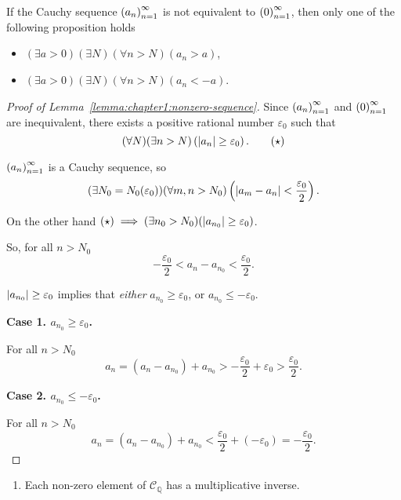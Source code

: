 \begin{lemma}\label{lemma:chapter1:nonzero-sequence}
    If the Cauchy sequence ${\left({a_{n}}\right)}^{\infty}_{n=1}$ is not equivalent to ${\left({0}\right)}^{\infty}_{n=1}$, then only one of the following proposition holds
    \begin{itemize}[itemsep=0pt]
        \item $(\exists a > 0)(\exists N)(\forall n > N)(a_{n} > a)$,
        \item $(\exists a > 0)(\exists N)(\forall n > N)(a_{n} < -a)$.
    \end{itemize}
\end{lemma}

\begin{proof}[Proof of Lemma~\ref{lemma:chapter1:nonzero-sequence}]
    Since ${\left({a_{n}}\right)}^{\infty}_{n=1}$ and ${\left({0}\right)}^{\infty}_{n=1}$ are inequivalent, there exists a positive rational number $\varepsilon_{0}$ such that
    \begin{equation*}
        (\forall N)(\exists n > N)\left(\left\vert{a_{n}}\right\vert\ge\varepsilon_{0}\right).\tag{$\star$}
    \end{equation*}

    ${\left({a_{n}}\right)}^{\infty}_{n=1}$ is a Cauchy sequence, so
    \[
        (\exists N_{0}=N_{0}(\varepsilon_{0}))(\forall m, n > N_{0})\left(\left\vert{a_{m} - a_{n}}\right\vert < \frac{\varepsilon_{0}}{2}\right).
    \]

    On the other hand $(\star)\implies (\exists n_{0} > N_{0})(\left\vert{a_{n_{0}}}\right\vert\ge\varepsilon_{0})$.

    So, for all $n > N_{0}$
    \[
        -\frac{\varepsilon_{0}}{2} < a_{n} - a_{n_{0}} < \frac{\varepsilon_{0}}{2}.
    \]

    $\left\vert{a_{n_{0}}}\right\vert\ge\varepsilon_{0}$ implies that \textit{either} $a_{n_{0}}\ge\varepsilon_{0}$, or $a_{n_{0}}\le-\varepsilon_{0}$.
    \bigskip

    \textbf{Case 1. $a_{n_{0}}\ge\varepsilon_{0}$.}

    For all $n > N_{0}$
    \[
        a_{n} = (a_{n} - a_{n_{0}}) + a_{n_{0}} > -\frac{\varepsilon_{0}}{2} + \varepsilon_{0} > \frac{\varepsilon_{0}}{2}.
    \]

    \textbf{Case 2. $a_{n_{0}}\le-\varepsilon_{0}$.}

    For all $n > N_{0}$
    \[
        a_{n} = (a_{n} - a_{n_{0}}) + a_{n_{0}} < \frac{\varepsilon_{0}}{2} + (-\varepsilon_{0}) = -\frac{\varepsilon_{0}}{2}.
    \]
\end{proof}

\begin{theorem}
    \begin{enumerate}[label={(F\arabic*)},start=9]
        \item Each non-zero element of $\mathscr{C}_{\mathbb{Q}}$ has a multiplicative inverse.
    \end{enumerate}
\end{theorem}

